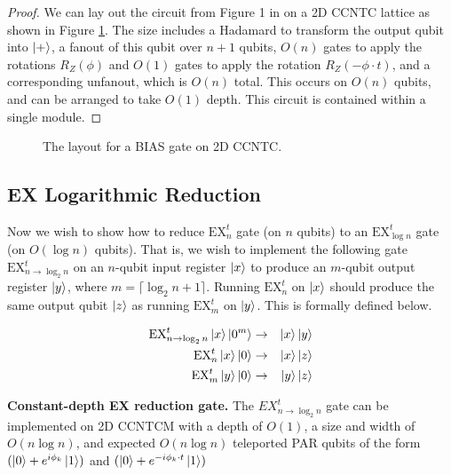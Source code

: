 \begin{proof}
We can lay out the circuit from Figure 1 in \cite{Takahashi2011} on a \textsf{2D CCNTC} lattice as
shown in Figure \ref{fig:mu-circuit}. The size includes a Hadamard to transform
the output qubit into $\left\vert{+}\right\rangle$, a fanout of this qubit over $n+1$ qubits,
$O(n)$ gates to apply the rotations $R_Z(\phi)$ and $O(1)$ gates to apply
the rotation $R_Z(-\phi\cdot t)$, and a corresponding unfanout, which is
$O(n)$ total. This occurs on $O(n)$ qubits, and can be arranged to take
$O(1)$ depth. This circuit is contained within a single module.
\end{proof}

\begin{figure}
\caption{The layout for a BIAS gate on 2D CCNTC.}
\label{fig:mu-circuit}
\end{figure}

\subsection{EX Logarithmic Reduction}
\label{subsec:ex-reduce}

Now we wish to show how to reduce $\text{EX}^t_n$ gate (on $n$ qubits) to an $\text{EX}^t_{\log n}$
gate (on $O(\log n)$ qubits). That is, we wish to implement the following gate
$\text{EX}^t_{n\rightarrow \log_2 n}$ on an $n$-qubit input register $\left\vert{x}\right\rangle$
to produce an $m$-qubit output register $\left\vert{y}\right\rangle$, where
$m = \lceil \log_2 n + 1 \rceil$. Running $\text{EX}^t_n$
on $\left\vert{x}\right\rangle$ should produce the same output qubit $\left\vert{z}\right\rangle$ as running
$\text{EX}^t_{m}$ on $\left\vert{y}\right\rangle$. This is formally defined below.

\begin{eqnarray}
\text{EX}^t_{n\rightarrow \log_2 n} \left\vert{x}\right\rangle\left\vert{0^m}\right\rangle & \rightarrow &\left\vert{x}\right\rangle\left\vert{y}\right\rangle \\
\text{EX}^t_n \left\vert{x}\right\rangle\left\vert{0}\right\rangle & \rightarrow & \left\vert{x}\right\rangle\left\vert{z}\right\rangle \\
\text{EX}^t_m \left\vert{y}\right\rangle\left\vert{0}\right\rangle & \rightarrow & \left\vert{y}\right\rangle\left\vert{z}\right\rangle
\end{eqnarray}

\begin{theorem}{\textbf{Constant-depth EX reduction gate.}}
The $EX^t_{n\rightarrow \log_2 n}$ gate can be implemented on \textsf{2D CCNTCM} with
a depth of $O(1)$, a size and width of $O(n\log n)$, and expected
$O(n\log n)$ teleported PAR qubits of the form $(\left\vert{0}\right\rangle + e^{i\phi_k}\left\vert{1}\right\rangle)$
and $(\left\vert{0}\right\rangle + e^{-i\phi_k\cdot t}\left\vert{1}\right\rangle)$
\label{thm:ex-reduce}
\end{theorem}

